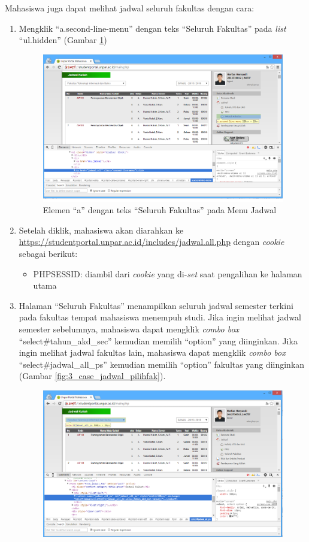 Mahasiswa juga dapat melihat jadwal seluruh fakultas dengan cara:
\begin{enumerate}
	\item Mengklik ``a.second-line-menu'' dengan teks ``Seluruh Fakultas'' pada \textit{list} ``ul.hidden'' (Gambar \ref{fig:3_case_jadwal_seluruh})
	\begin{figure}[H]
			\centering
			\includegraphics[scale=0.4]{Gambar/case-jadwal-seluruh}
			\caption{Elemen ``a'' dengan teks ``Seluruh Fakultas'' pada Menu Jadwal} 
			\label{fig:3_case_jadwal_seluruh}
		\end{figure}
	\item Setelah diklik, mahasiswa akan diarahkan ke \url{https://studentportal.unpar.ac.id/includes/jadwal.all.php} dengan \textit{cookie} sebagai berikut:
\begin{itemize}
	\item PHPSESSID: diambil dari \textit{cookie} yang di-\textit{set} saat pengalihan ke halaman utama
\end{itemize}
		\item Halaman ``Seluruh Fakultas'' menampilkan seluruh jadwal semester terkini pada fakultas tempat mahasiswa menempuh studi. Jika ingin melihat jadwal semester sebelumnya, mahasiswa dapat mengklik \textit{combo box} ``select\#tahun\_akd\_sec'' kemudian memilih ``option'' yang diinginkan. Jika ingin melihat jadwal fakultas lain, mahasiswa dapat mengklik \textit{combo box} ``select\#jadwal\_all\_ps'' kemudian memilih ``option'' fakultas yang diinginkan (Gambar \ref{fig:3_case_jadwal_pilihfak}).
		\begin{figure}[H]
			\centering
			\includegraphics[scale=0.4]{Gambar/case-jadwal-pilihfak}

\end{figure}
\end{enumerate}
